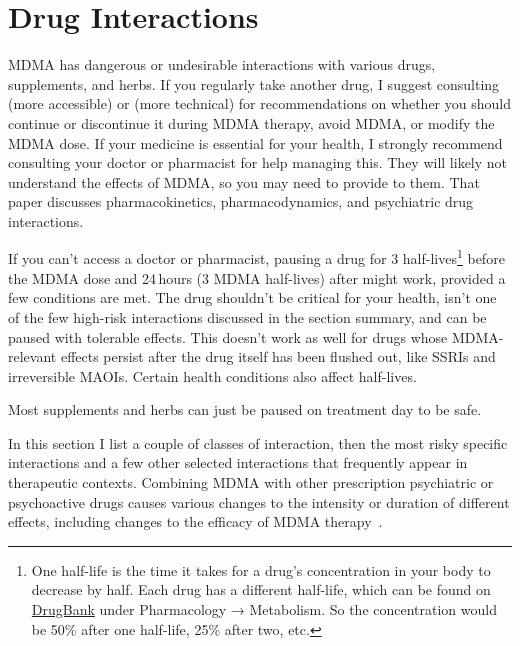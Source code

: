 \documentclass[11pt,oneside]{book}
\let\cite\parencite
\begin{document}
\section{Drug Interactions}
\label{interactions}
MDMA has dangerous or undesirable interactions with various drugs, supplements, and herbs. If you regularly take another drug, I suggest consulting \textcite{liechtiInteractions,spiritMemberProgram} (more accessible) or \textcite{sarparastDrugInteractions} (more technical) for recommendations on whether you should continue or discontinue it during MDMA therapy, avoid MDMA, or modify the MDMA dose. If your medicine is essential for your health, I strongly recommend consulting your doctor or pharmacist for help managing this. They will likely not understand the effects of MDMA, so you may need to provide \textcite{sarparastDrugInteractions} to them. That paper discusses pharmacokinetics, pharmacodynamics, and psychiatric drug interactions.

If you can't access a doctor or pharmacist, pausing a drug for 3 half-lives\footnote{One half-life is the time it takes for a drug's concentration in your body to decrease by half. Each drug has a different half-life, which can be found on \href{https://go.drugbank.com}{DrugBank} under Pharmacology → Metabolism. So the concentration would be 50\% after one half-life, 25\% after two, etc.} before the MDMA dose and 24\,hours (3 MDMA half-lives) after might work, provided a few conditions are met. The drug shouldn't be critical for your health, isn't one of the few high-risk interactions discussed in the section summary, and can be paused with tolerable effects. This doesn't work as well for drugs whose MDMA-relevant effects persist after the drug itself has been flushed out, like SSRIs and irreversible MAOIs. Certain health conditions also affect half-lives.

Most supplements and herbs can just be paused on treatment day to be safe.

In this section I list a couple of classes of interaction, then the most risky specific interactions and a few other selected interactions that frequently appear in therapeutic contexts. Combining MDMA with other prescription psychiatric or psychoactive drugs causes various changes to the intensity or duration of different effects, including changes to the efficacy of MDMA therapy~\cite{sarparastDrugInteractions}.
\end{document}
